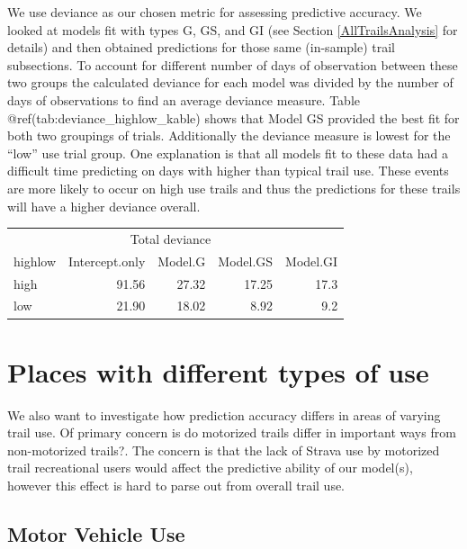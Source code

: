 \documentclass[
]{book}
\begin{document}
We use deviance as our chosen metric for assessing predictive accuracy. We looked at models fit with types G, GS, and GI (see Section \ref{AllTrailsAnalysis} for details) and then obtained predictions for those same (in-sample) trail subsections. To account for different number of days of observation between these two groups the calculated deviance for each model was divided by the number of days of observations to find an average deviance measure. Table @ref(tab:deviance\_highlow\_kable) shows that Model GS provided the best fit for both two groupings of trials. Additionally the deviance measure is lowest for the ``low'' use trial group. One explanation is that all models fit to these data had a difficult time predicting on days with higher than typical trail use. These events are more likely to occur on high use trails and thus the predictions for these trails will have a higher deviance overall.

\begin{table}
\centering
\begin{tabular}{lrrrr}
\toprule
\multicolumn{1}{c}{ } & \multicolumn{3}{c}{Total deviance} \\
\cmidrule(l{3pt}r{3pt}){2-4}
highlow & Intercept.only & Model.G & Model.GS & Model.GI\\
\midrule
high & 91.56 & 27.32 & 17.25 & 17.3\\
low & 21.90 & 18.02 & 8.92 & 9.2\\
\bottomrule
\end{tabular}
\end{table}

\hypertarget{places-with-different-types-of-use}{%
\section{Places with different types of use}\label{places-with-different-types-of-use}}

We also want to investigate how prediction accuracy differs in areas of varying trail use. Of primary concern is do motorized trails differ in important ways from non-motorized trails?. The concern is that the lack of Strava use by motorized trail recreational users would affect the predictive ability of our model(s), however this effect is hard to parse out from overall trail use.

\hypertarget{motor-vehicle-use}{%
\subsection{Motor Vehicle Use}\label{motor-vehicle-use}}
\end{document}
